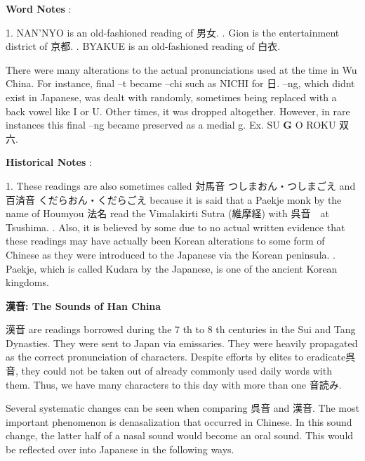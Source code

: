 \par{\textbf{Word Notes }: }

\par{1. NAN'NYO is an old-fashioned reading of 男女. \hfill{}. Gion is the entertainment district of 京都. \hfill{}. BYAKUE is an old-fashioned reading of 白衣. }

\par{ There were many alterations to the actual pronunciations used at the time in Wu China. For instance, final –t became –chi such as NICHI for 日. –ng, which didn\textquotesingle t exist in Japanese, was dealt with randomly, sometimes being replaced with a back vowel like I or U. Other times, it was dropped altogether. However, in rare instances this final –ng became preserved as a medial g. Ex. SU \textbf{G }O ROKU 双六. }

\par{\textbf{Historical Notes }: }

\par{1. These readings are also sometimes called 対馬音 つしまおん・つしまごえ and　百済音 くだらおん・くだらごえ because it is said that a Paekje monk by the name of Houmyou 法名 read the Vimalakirti Sutra (維摩経) with 呉音　at Tsushima. \hfill{}. Also, it is believed by some due to no actual written evidence that these readings may have actually been Korean alterations to some form of Chinese as they were introduced to the Japanese via the Korean peninsula. \hfill{}. Paekje, which is called Kudara by the Japanese, is one of the ancient Korean kingdoms. }

\par{\textbf{漢音: The Sounds of Han China }}

\par{ 漢音 are readings borrowed during the 7 th to 8 th centuries in the Sui and Tang Dynasties. They were sent to Japan via emissaries. They were heavily propagated as the correct pronunciation of characters. Despite efforts by elites to eradicate呉音, they could not be taken out of already commonly used daily words with them. Thus, we have many characters to this day with more than one 音読み. }

\par{ Several systematic changes can be seen when comparing 呉音 and 漢音. The most important phenomenon is denasalization that occurred in Chinese. In this sound change, the latter half of a nasal sound would become an oral sound. This would be reflected over into Japanese in the following ways. }

